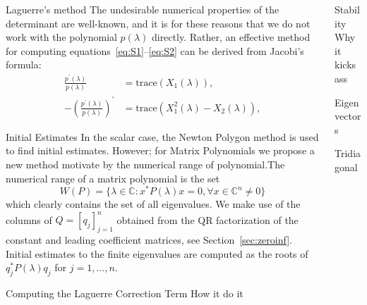 \documentclass[final,hyperref={pdfpagelabels=false}]{beamer}
\begin{document}
\begin{columns}[t]
\begin{column}{.48\linewidth}
\begin{block}{\large Laguerre's method}
				The undesirable numerical properties of the determinant are well-known, and it is for these reasons that we do not work with the polynomial $p(\lambda)$ directly. Rather, an effective method for computing equations~\eqref{eq:S1}--\eqref{eq:S2} can be derived from Jacobi's formula:
				\begin{equation}\label{eq:clit}
				\begin{split}
				\frac{p^{'}(\lambda)}{p(\lambda)}&=\text{trace}\left(X_{1}(\lambda)\right),\\
				-\left(\frac{p^{'}(\lambda)}{p(\lambda)}\right)^{'}&=\text{trace}\left(X_{1}^{2}(\lambda)-X_{2}(\lambda)\right),
				\end{split}
				\end{equation}
			\end{block}
			\begin{block}{Initial Estimates}
				In the scalar case, the Newton Polygon method is used to find initial estimates. However; for Matrix Polynomials we propose a new method motivate by the numerical range of polynomial.The numerical range of a matrix polynomial is the
				set
				\begin{equation}\label{eq:WP}
				W(P) = \{\lambda \in  \mathbb{C}: x^*P(\lambda)x = 0, \forall x\in \mathbb{C}^n\neq 0\}
				\end{equation}
				which clearly contains the set of all eigenvalues. We make use of the columns of $Q=[q_{j}]_{j=1}^{n}$ obtained from the QR factorization of the constant and leading coefficient matrices, see Section~\ref{sec:zeroinf}. Initial estimates to the finite eigenvalues are computed as the roots of $q_{j}^{*}P(\lambda)q_{j}$ for $j=1,\ldots,n$.
			\end{block}
		
			\begin{block}{Computing the Laguerre Correction Term}
 How it do it 
			\end{block}
		

		\end{column}
		\begin{column}{.48\linewidth}
			\begin{block}{Stability}
		Why it kicks ass
			\end{block}
					\begin{block}{Eigenvectors}
			
		\end{block}
		
		\begin{block}{Tridiagonal}
			
		\end{block}
		\end{column}
		\end{columns}
\end{document}

